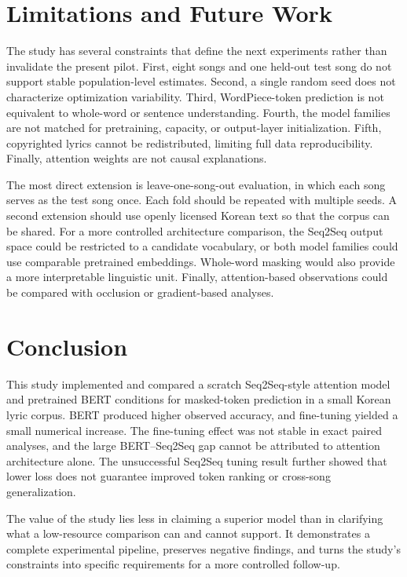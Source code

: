 \documentclass[10pt,letterpaper]{article}
\begin{document}
\section{Limitations and Future Work}
The study has several constraints that define the next experiments rather than invalidate the present pilot. First, eight songs and one held-out test song do not support stable population-level estimates. Second, a single random seed does not characterize optimization variability. Third, WordPiece-token prediction is not equivalent to whole-word or sentence understanding. Fourth, the model families are not matched for pretraining, capacity, or output-layer initialization. Fifth, copyrighted lyrics cannot be redistributed, limiting full data reproducibility. Finally, attention weights are not causal explanations.

The most direct extension is leave-one-song-out evaluation, in which each song serves as the test song once. Each fold should be repeated with multiple seeds. A second extension should use openly licensed Korean text so that the corpus can be shared. For a more controlled architecture comparison, the Seq2Seq output space could be restricted to a candidate vocabulary, or both model families could use comparable pretrained embeddings. Whole-word masking would also provide a more interpretable linguistic unit. Finally, attention-based observations could be compared with occlusion or gradient-based analyses.

\section{Conclusion}
This study implemented and compared a scratch Seq2Seq-style attention model and pretrained BERT conditions for masked-token prediction in a small Korean lyric corpus. BERT produced higher observed accuracy, and fine-tuning yielded a small numerical increase. The fine-tuning effect was not stable in exact paired analyses, and the large BERT--Seq2Seq gap cannot be attributed to attention architecture alone. The unsuccessful Seq2Seq tuning result further showed that lower loss does not guarantee improved token ranking or cross-song generalization.

The value of the study lies less in claiming a superior model than in clarifying what a low-resource comparison can and cannot support. It demonstrates a complete experimental pipeline, preserves negative findings, and turns the study's constraints into specific requirements for a more controlled follow-up.
\end{document}
